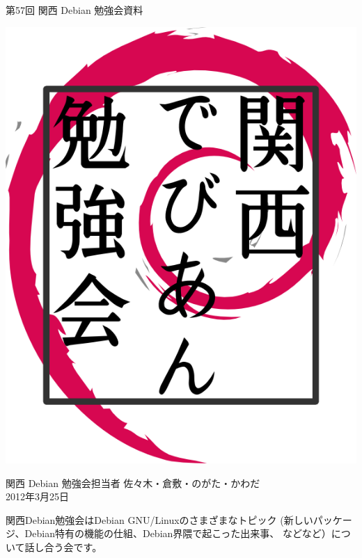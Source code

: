 \documentclass[mingoth,a4paper]{jsarticle}
\newcommand{\debmtgyear}{2012}
\newcommand{\debmtgdate}{25}
\newcommand{\debmtgmonth}{3}
\newcommand{\debmtgnumber}{57}
\begin{document}
\begin{titlepage}


 第\debmtgnumber{}回 関西 Debian 勉強会資料

\vspace{2cm}

\begin{center}
\includegraphics{image200802/kansaidebianlogo.png}
\end{center}

\begin{flushright}
\hfill{}関西 Debian 勉強会担当者 佐々木・倉敷・のがた・かわだ \\
\hfill{}\debmtgyear{}年\debmtgmonth{}月\debmtgdate{}日
\end{flushright}

\thispagestyle{empty}
\end{titlepage}


 関西Debian勉強会はDebian GNU/Linuxのさまざまなトピック
 (新しいパッケージ、Debian特有の機能の仕組、Debian界隈で起こった出来事、
 などなど）について話し合う会です。
\end{document}
